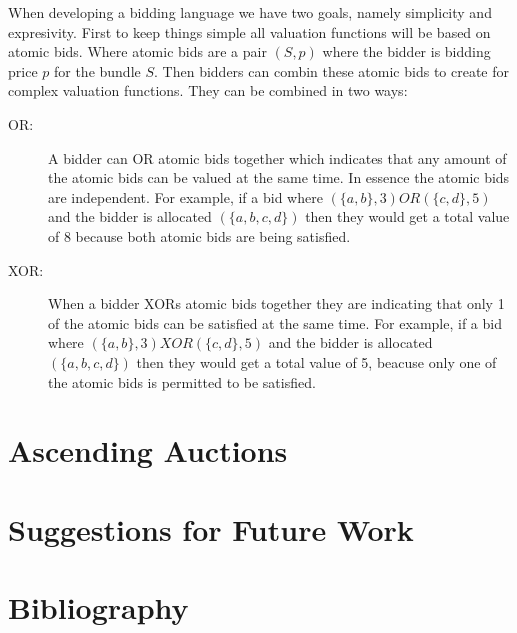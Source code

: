 \documentclass[10pt,onecolumn,letterpaper]{article}
\theoremstyle{definition}
\begin{document}
When developing a bidding language we have two goals, namely simplicity and expresivity. First to keep things simple all valuation functions will be based on atomic bids. Where atomic bids are a pair $(S,p)$ where the bidder is bidding price $p$ for the bundle $S$. Then bidders can combin these atomic bids to create for complex valuation functions. They can be combined in two ways:

\begin{description}
  \item [OR:] A bidder can OR atomic bids together which indicates that any amount of the atomic bids can be valued at the same time. In essence the atomic bids are independent. For example, if a bid where $(\{a,b\}, 3) OR (\{c,d\}, 5)$ and the bidder is allocated $(\{a,b,c,d\})$ then they would get a total value of 8 because both atomic bids are being satisfied. 

  \item [XOR:] When a bidder XORs atomic bids together they are indicating that only 1 of the atomic bids can be satisfied at the same time. For example, if a bid where $(\{a,b\}, 3) XOR (\{c,d\}, 5)$ and the bidder is allocated $(\{a,b,c,d\})$ then they would get a total value of 5, beacuse only one of the atomic bids is permitted to be satisfied.

\end{description}

\section{Ascending Auctions} %



\section{Suggestions for Future Work} %



\section{Bibliography} %
\end{document}

